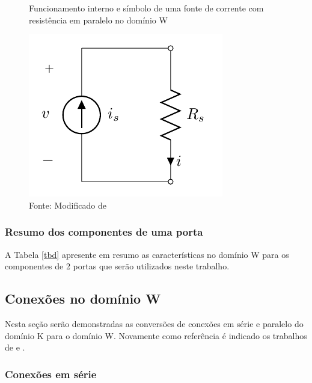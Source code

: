 	\begin{figure}[h]
		\label{figFonteCorrenteDominioW}
		\caption{Funcionamento interno e símbolo de uma fonte de corrente com resistência em paralelo no domínio W}
		\includegraphics[scale=0.5]{images/fonteCorrenteModelada}
		\centering
		\caption*{Fonte: Modificado de \cite{Bogason2017}}
	\end{figure}
	
	
		\subsubsection{Resumo dos componentes de uma porta}
	A Tabela \ref{tbd} apresente em resumo as características no domínio W para os componentes de 2 portas que serão utilizados neste trabalho.
	
	
	\subsection{Conexões no domínio W}
	\label{secConexoesNoDominioW}
	
	Nesta seção serão demonstradas as conversões de conexões em série e paralelo do domínio K para o domínio W. Novamente como referência é indicado os trabalhos de  e   .
	
		\subsubsection{Conexões em série}
		

